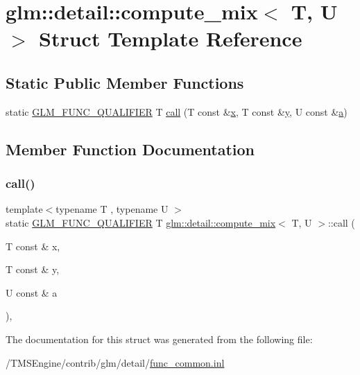 \hypertarget{structglm_1_1detail_1_1compute__mix}{}\section{glm\+:\+:detail\+:\+:compute\+\_\+mix$<$ T, U $>$ Struct Template Reference}
\label{structglm_1_1detail_1_1compute__mix}
\subsection*{Static Public Member Functions}
\begin{DoxyCompactItemize}
\item 
static \hyperlink{setup_8hpp_a33fdea6f91c5f834105f7415e2a64407}{G\+L\+M\+\_\+\+F\+U\+N\+C\+\_\+\+Q\+U\+A\+L\+I\+F\+I\+ER} T \hyperlink{structglm_1_1detail_1_1compute__mix_a13fd963d8385f36486509a48fd68da1c}{call} (T const \&\hyperlink{_s_d_l__opengl_8h_ad0e63d0edcdbd3d79554076bf309fd47}{x}, T const \&\hyperlink{_s_d_l__opengl_8h_a1675d9d7bb68e1657ff028643b4037e3}{y}, U const \&\hyperlink{_s_d_l__opengl__glext_8h_a3309789fc188587d666cda5ece79cf82}{a})
\end{DoxyCompactItemize}


\subsection{Member Function Documentation}
\mbox{\label{structglm_1_1detail_1_1compute__mix_a13fd963d8385f36486509a48fd68da1c}} 
\subsubsection{\texorpdfstring{call()}{call()}}
{\footnotesize\ttfamily template$<$typename T , typename U $>$ \\
static \hyperlink{setup_8hpp_a33fdea6f91c5f834105f7415e2a64407}{G\+L\+M\+\_\+\+F\+U\+N\+C\+\_\+\+Q\+U\+A\+L\+I\+F\+I\+ER} T \hyperlink{structglm_1_1detail_1_1compute__mix}{glm\+::detail\+::compute\+\_\+mix}$<$ T, U $>$\+::call (\begin{DoxyParamCaption}\item[{T const \&}]{x,  }\item[{T const \&}]{y,  }\item[{U const \&}]{a }\end{DoxyParamCaption})\hspace{0.3cm}{\ttfamily [inline]}, {\ttfamily [static]}}



The documentation for this struct was generated from the following file\+:\begin{DoxyCompactItemize}
\item 
/\+T\+M\+S\+Engine/contrib/glm/detail/\hyperlink{func__common_8inl}{func\+\_\+common.\+inl}\end{DoxyCompactItemize}

